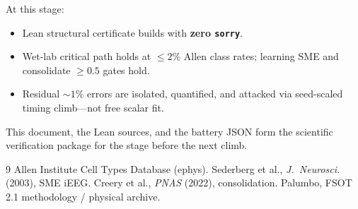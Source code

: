 \documentclass[11pt,a4paper]{article}
\begin{document}
At this stage:
\begin{itemize}[leftmargin=*]
  \item Lean structural certificate builds with \textbf{zero \texttt{sorry}}.
  \item Wet-lab critical path holds at \textbf{\(\le 2\%\)} Allen class rates;
        learning SME and consolidate \(\ge 0.5\) gates hold.
  \item Residual \(\sim 1\%\) errors are isolated, quantified, and attacked via
        seed-scaled timing climb---not free scalar fit.
\end{itemize}
This document, the Lean sources, and the battery JSON form the scientific
verification package for the stage before the next climb.

\begin{thebibliography}{9}
 Allen Institute Cell Types Database (ephys).
 Sederberg et al., \emph{J.~Neurosci.} (2003), SME iEEG.
 Creery et al., \emph{PNAS} (2022), consolidation.
 Palumbo, FSOT 2.1 methodology / physical archive.
\end{thebibliography}
\end{document}
